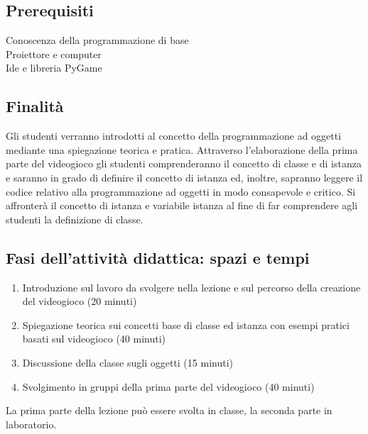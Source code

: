 \documentclass[12pt,a4paper]{article}
\begin{document}
\subsection*{Prerequisiti}
Conoscenza della programmazione di base\\
Proiettore e computer\\
Ide e libreria PyGame


\subsection*{Finalità}
Gli studenti verranno introdotti al concetto della programmazione ad oggetti mediante una spiegazione teorica e pratica. Attraverso l’elaborazione della prima parte del videogioco gli studenti comprenderanno il concetto di classe e di istanza e saranno in grado di definire il concetto di istanza ed, inoltre, sapranno leggere il codice relativo alla programmazione ad oggetti in modo consapevole e critico. Si affronterà il concetto di istanza e variabile istanza al fine di far comprendere agli studenti la definizione di classe. 


\subsection*{Fasi dell'attività didattica: spazi e tempi}

\begin{enumerate}
	\item Introduzione sul lavoro da svolgere nella lezione e sul percorso della creazione del videogioco (20 minuti)
	\item Spiegazione teorica sui concetti base di classe ed istanza con esempi pratici basati sul videogioco (40 minuti)
	\item Discussione della classe sugli oggetti (15 minuti)
	\item Svolgimento in gruppi della prima parte del videogioco (40 minuti)
\end{enumerate}
La prima parte della lezione può essere svolta in classe, la seconda parte in laboratorio.
\end{document}
